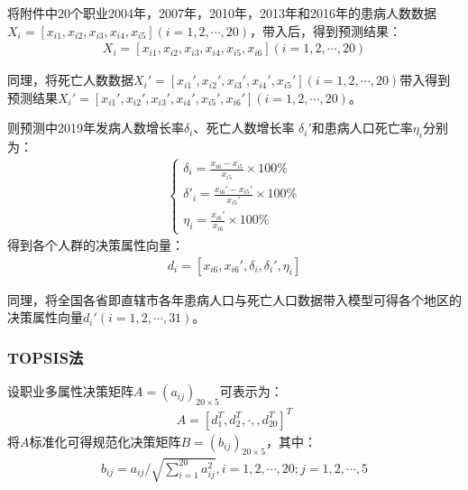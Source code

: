 \documentclass{whutmod}
\begin{document}
	     
	     
	  将附件中$20$个职业2004年，2007年，2010年，2013年和2016年的患病人数数据$X_{i}=[x_{i1},x_{i2},x_{i3},x_{i4},x_{i5}](i=1,2,\cdots,20)$，带入后，得到预测结果：
     \begin{gather*}
      X_{i}=[x_{i1},x_{i2},x_{i3},x_{i4},x_{i5},x_{i6}](i=1,2,\cdots,20)
     \end{gather*}
     
     同理，将死亡人数数据$X_{i}'=[x_{i1}',x_{i2}',x_{i3}',x_{i4}',x_{i5}'](i=1,2,\cdots,20)$带入得到预测结果$X_{i}'=[x_{i1}',x_{i2}',x_{i3}',x_{i4}',x_{i5}',x_{i6}'](i=1,2,\cdots,20)$。


     则预测中2019年发病人数增长率$ \delta_{i}$、死亡人数增长率 $ \delta _{i}'$和患病人口死亡率$\eta_{i}$分别为：
      \begin{gather}
      \left\{\begin{matrix}
      \delta _{i}=\frac{x_{i6}-x_{i5}}{x_{i5}} \times 100\%\\ 
      \delta '_{i} =\frac{x_{i6}'-x_{i5}'}{x_{i5}'} \times 100\%\\ 
      \eta_{i} =\frac{x_{i6}'}{x_{i6}} \times 100\%
      \end{matrix}\right.
      \end{gather}
      得到各个人群的决策属性向量：
      \begin{gather*}
      d_{i}=[x_{i6},x_{i6}', \delta_{i} , \delta _{i}',\eta_{i} ]
      \end{gather*}
      
      同理，将全国各省即直辖市各年患病人口与死亡人口数据带入模型可得各个地区的决策属性向量$d_{i}'(i=1,2,\cdots,31)$。
    \subsubsection{TOPSIS法}
    设职业多属性决策矩阵$A=(a_{ij})_{20 \times 5}$可表示为：
     \begin{gather*}
  A= [d_{1}^{T},d_{2}^{T},\cdot,,d_{20}^{T}]^{T}
    \end{gather*}
    将$A$标准化可得规范化决策矩阵$B=(b_{ij})_{20 \times 5}$，其中：
     \begin{gather*}
   b_{ij}=a_{ij}/\sqrt{\sum_{i=1}^{20}a_{ij}^{2}},i=1,2,\cdots,20;j=1,2,\cdots,5
    \end{gather*}
    
\end{document}
